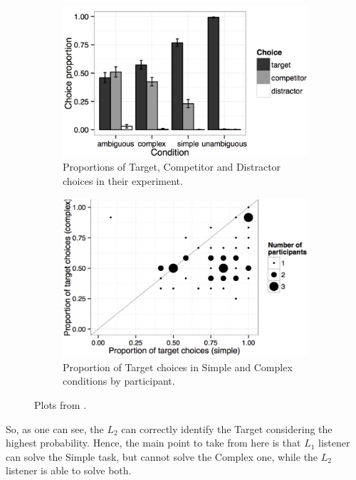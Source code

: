 \begin{figure}
\centering
\begin{subfigure}{.5\textwidth}
  \centering
  \includegraphics[width=1\linewidth]{images/trials_stats.png}
  \caption{Proportions of Target, Competitor and Distractor choices in their experiment. }
  \label{fig:trial_stats}
\end{subfigure}%
\begin{subfigure}{.5\textwidth}
  \centering
  \includegraphics[width=1\linewidth]{images/l1_l2_stats.png}
  \caption{Proportion of Target choices in Simple and Complex conditions by participant. }
  \label{fig:prob_stats}
\end{subfigure}
\caption{Plots from \cite{Franke_2016}.}
\label{fig:stats}
\end{figure}

So, as one can see, the $L_2$ can correctly identify the Target considering the highest probability. Hence, the main point to take from here is that $L_1$ listener can solve the Simple task, but cannot solve the Complex one, while the $L_2$ listener is able to solve both. 

